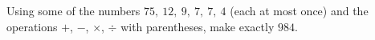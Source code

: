 Using some of the numbers $75,\ 12,\ 9,\ 7,\ 7,\ 4$ (each at most once) and the operations $+$, $-$, $\times$, $\div$ with parentheses, make exactly $984$.
